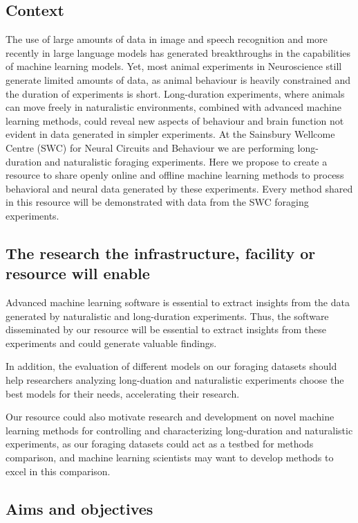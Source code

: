 \subsection{Context}

The use of large amounts of data in image and speech recognition and more
recently in large language models has generated breakthroughs in the
capabilities of machine learning models. Yet, most animal experiments in
Neuroscience still generate limited amounts of data, as animal behaviour is
heavily constrained and the duration of experiments is short.
%
Long-duration experiments, where animals can move freely in naturalistic
environments, combined with advanced machine learning methods, could reveal new
aspects of behaviour and brain function not evident in data generated in
simpler experiments.
%
At the Sainsbury Wellcome Centre (SWC) for Neural Circuits and Behaviour we are
performing long-duration and naturalistic foraging experiments.
%
Here we propose to create a resource to share openly online and offline machine
learning methods to process behavioral and neural data generated by these
experiments. Every method shared in this resource will be demonstrated with
data from the SWC foraging experiments.

\subsection{The research the infrastructure, facility or resource will enable}

Advanced machine learning software is essential to extract insights from the
data generated by naturalistic and long-duration experiments. Thus, the software
disseminated by our resource will be essential to extract insights from these
experiments and could generate valuable findings.

In addition, the evaluation of different models on our foraging datasets should
help researchers analyzing long-duation and naturalistic experiments choose the
best models for their needs, accelerating their research.

Our resource could also motivate research and development on novel machine
learning methods for controlling and characterizing long-duration and
naturalistic experiments, as our foraging datasets could act as a testbed for
methods comparison, and machine learning scientists may want to develop methods
to excel in this comparison.

\subsection{Aims and objectives}

